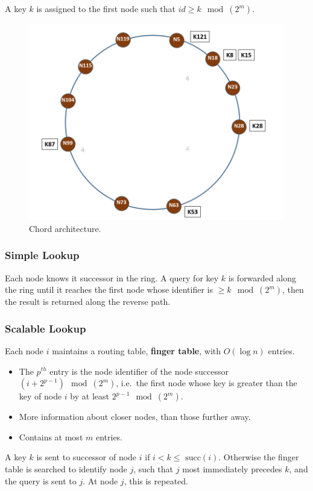 \documentclass[11pt]{article}
\begin{document}
A key $k$ is assigned to the first node such that $id \geq k \mod (2^m)$.

\begin{figure}[htb!]
  \centering
  \caption{Chord architecture.}
  \includegraphics[scale=0.5]{chordarc}
\end{figure}

\subsubsection{Simple Lookup}
Each node knows it successor in the ring.
A query for key $k$ is forwarded along the ring until it reaches the first node whose identifier is $\geq k \mod(2^m)$, then the result is returned along the reverse path.

\subsubsection{Scalable Lookup}
Each node $i$ maintains a routing table, \textbf{finger table}, with $O(\log n)$ entries.
\begin{itemize}
  \item The $p^{th}$ entry is the node identifier of the node successor $(i + 2^{p - 1}) \mod(2 ^m)$, i.e.\ the first node whose key is greater than the key of node $i$ by at least $2^{p-1} \mod (2^m)$.
  \item More information about closer nodes, than those further away.
  \item Contains at most $m$ entries.
\end{itemize}

A key $k$ is sent to successor of node $i$ if $i < k \leq \text{ succ}(i)$.
Otherwise the finger table is searched to identify node $j$, such that $j$ most immediately precedes $k$, and the query is sent to $j$.
At node $j$, this is repeated.
\end{document}
